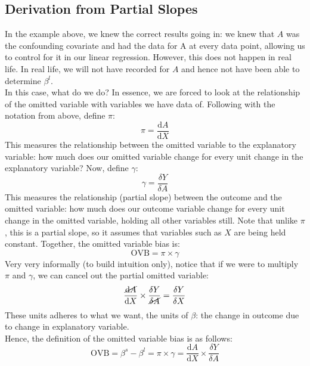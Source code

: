 \documentclass{article}
\begin{document}
\subsection{Derivation from Partial Slopes}
In the example above, we knew the correct results going in: we knew that $A$ was the confounding covariate and had the data for A at every data point, allowing us to control for it in our linear regression.
However, this does not happen in real life.
In real life, we will not have recorded for $A$ and hence not have been able to determine $\beta^l$.
\\
In this case, what do we do?
In essence, we are forced to look at the relationship of the omitted variable with variables we have data of.
Following with the notation from above, define $\pi$:
$$\pi = \frac{\text{d}A}{\text{d}X}$$
This measures the relationship between the omitted variable to the explanatory variable: how much does our omitted variable change for every unit change in the explanatory variable?
Now, define $\gamma$:
$$\gamma = \frac{\delta Y}{\delta A}$$
This measures the relationship (partial slope) between the outcome and the omitted variable: how much does our outcome variable change for every unit change in the omitted variable, holding all other variables still.
Note that unlike $\pi$, this is a partial slope, so it assumes that variables such as $X$ are being held constant.
Together, the omitted variable bias is:
$$\text{OVB} = \pi \times \gamma $$
Very very informally (to build intuition only), notice that if we were to multiply $\pi$ and $\gamma$, we can cancel out the partial omitted variable:
$$\frac{\cancel{\text{d}A}}{\text{d}X} \times \frac{\delta Y}{\cancel{\delta A}} = \frac{\delta Y}{\delta X}$$
These units adheres to what we want, the units of $\beta$: the change in outcome due to change in explanatory variable. 
\\
Hence, the definition of the omitted variable bias is as follows:
$$\text{OVB} = \beta^s - \beta^l = \pi \times \gamma = \frac{\text{d}A}{\text{d}X} \times \frac{\delta Y}{\delta A}$$
\end{document}
